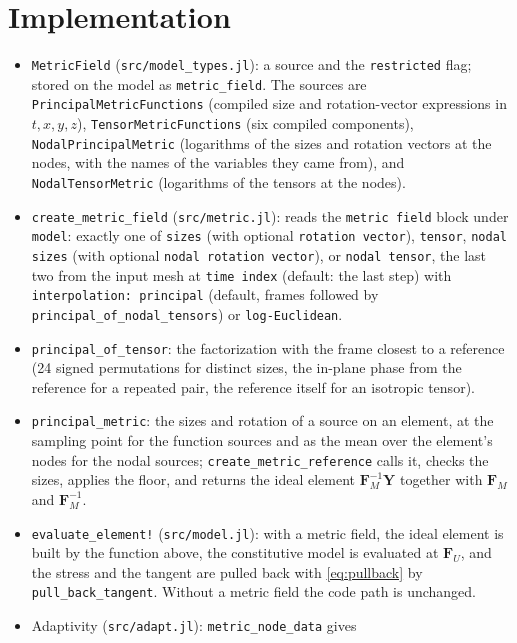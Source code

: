 \documentclass[11pt]{article}
\newcommand{\bs}[1]{\boldsymbol{#1}}
\newcommand{\code}[1]{\texttt{#1}}
\begin{document}
\section{Implementation}
\label{sec:implementation}

\begin{itemize}[itemsep=2pt]
\item \code{MetricField} (\code{src/model\_types.jl}): a source and the
  \code{restricted} flag; stored on the model as \code{metric\_field}.
  The sources are \code{PrincipalMetricFunctions} (compiled size and
  rotation-vector expressions in $t, x, y, z$),
  \code{TensorMetricFunctions} (six compiled components),
  \code{NodalPrincipalMetric} (logarithms of the sizes and rotation
  vectors at the nodes, with the names of the variables they came from),
  and \code{NodalTensorMetric} (logarithms of the tensors at the nodes).
\item \code{create\_metric\_field} (\code{src/metric.jl}): reads the
  \code{metric field} block under \code{model}: exactly one of
  \code{sizes} (with optional \code{rotation vector}), \code{tensor},
  \code{nodal sizes} (with optional \code{nodal rotation vector}), or
  \code{nodal tensor}, the last two from the input mesh at
  \code{time index} (default: the last step) with
  \code{interpolation: principal} (default, frames followed by
  \code{principal\_of\_nodal\_tensors}) or \code{log-Euclidean}.
\item \code{principal\_of\_tensor}: the factorization with the frame
  closest to a reference (24 signed permutations for distinct sizes, the
  in-plane phase from the reference for a repeated pair, the reference
  itself for an isotropic tensor).
\item \code{principal\_metric}: the sizes and rotation of a source on an
  element, at the sampling point for the function sources and as the mean
  over the element's nodes for the nodal sources;
  \code{create\_metric\_reference} calls it, checks the sizes, applies the
  floor, and returns the ideal element $\bs F_M^{-1} \bs Y$ together with
  $\bs F_M$ and $\bs F_M^{-1}$.
\item \code{evaluate\_element!} (\code{src/model.jl}): with a metric
  field, the ideal element is built by the function above, the
  constitutive model is evaluated at $\bs F_U$, and the stress and the
  tangent are pulled back with \eqref{eq:pullback} by
  \code{pull\_back\_tangent}. Without a metric field the code path is
  unchanged.
\item Adaptivity (\code{src/adapt.jl}): \code{metric\_node\_data} gives

\end{itemize}
\end{document}
